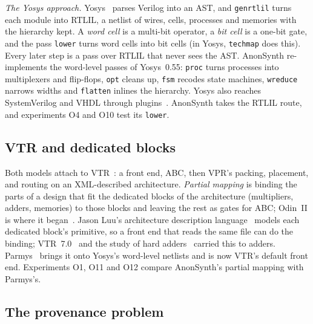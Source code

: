 \documentclass[conference]{IEEEtran}
\newcommand{\code}[1]{\texttt{#1}}
\begin{document}
\emph{The Yosys approach.} Yosys~\cite{wolf2013yosys} parses Verilog into an AST, and \code{genrtlil} turns each module into RTLIL, a netlist of wires, cells, processes and memories with the hierarchy kept. A \emph{word cell} is a multi-bit operator, a \emph{bit cell} is a one-bit gate, and the pass \code{lower} turns word cells into bit cells (in Yosys, \code{techmap} does this). %
Every later step is a pass over RTLIL that never sees the AST. AnonSynth re-implements the word-level passes of Yosys~0.55: \code{proc} turns processes into multiplexers and flip-flops, \code{opt} cleans up, \code{fsm} recodes state machines, \code{wreduce} narrows widths and \code{flatten} inlines the hierarchy. %
Yosys also reaches SystemVerilog and VHDL through plugins~\cite{yosysslang,ghdl}. AnonSynth takes the RTLIL route, and experiments O4 and O10 test its \code{lower}.

\subsection{VTR and dedicated blocks}

Both models attach to VTR~\cite{anon12,anon11,luu2014vtr7,murray2020vtr8}: a front end, ABC, then VPR's packing, placement, and routing on an XML-described architecture. \emph{Partial mapping} is binding the parts of a design that fit the dedicated blocks of the architecture (multipliers, adders, memories) to those blocks and leaving the rest as gates for ABC; Odin~II is where it began~\cite{anon10}. %
Jason Luu's architecture description language~\cite{luu2011packing} models each dedicated block's primitive, so a front end that reads the same file can do the binding; VTR~7.0~\cite{luu2014vtr7} and the study of hard adders~\cite{luu2014hardadders} carried this to adders. Parmys~\cite{parmys} brings it onto Yosys's word-level netlists and is now VTR's default front end. Experiments O1, O11 and O12 compare AnonSynth's partial mapping with Parmys's.

\subsection{The provenance problem}
\label{sec:provenance-problem}
\end{document}
